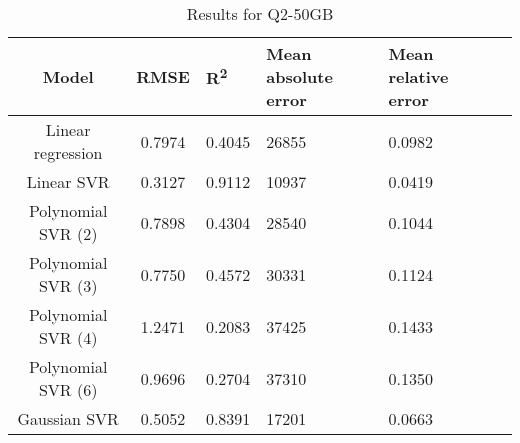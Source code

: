 \begin{table}[H]
\centering
\begin{adjustbox}{center}
\begin{tabular}{c | c M{1.2cm} M{2.5cm} M{2.5cm} M{1.8cm}}
Model & RMSE & R\textsuperscript{2} & Mean absolute error & Mean relative error \tabularnewline
\hline
Linear regression & 0.7974 & 0.4045 &  26855 & 0.0982 \\
Linear SVR & 0.3127 & 0.9112 &  10937 & 0.0419 \\
Polynomial SVR (2) & 0.7898 & 0.4304 &  28540 & 0.1044 \\
Polynomial SVR (3) & 0.7750 & 0.4572 &  30331 & 0.1124 \\
Polynomial SVR (4) & 1.2471 & 0.2083 &  37425 & 0.1433 \\
Polynomial SVR (6) & 0.9696 & 0.2704 &  37310 & 0.1350 \\
Gaussian SVR & 0.5052 & 0.8391 &  17201 & 0.0663 \\
\end{tabular}
\end{adjustbox}
\\
\caption{Results for Q2-50GB}
\label{tab:all_linear_Q2_50}
\end{table}
